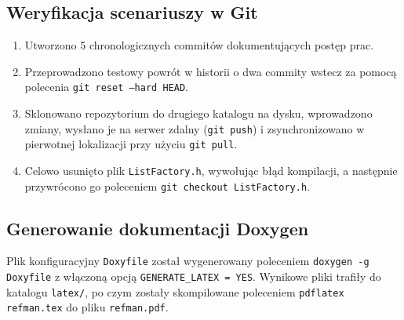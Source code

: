\subsection{Weryfikacja scenariuszy w Git}
\begin{enumerate}
    \item Utworzono 5 chronologicznych commitów dokumentujących postęp prac.
    \item Przeprowadzono testowy powrót w historii o dwa commity wstecz za pomocą polecenia \texttt{git reset --hard HEAD}.
    \item Sklonowano repozytorium do drugiego katalogu na dysku, wprowadzono zmiany, wysłano je na serwer zdalny (\texttt{git push}) i zsynchronizowano w pierwotnej lokalizacji przy użyciu \texttt{git pull}.
    \item Celowo usunięto plik \texttt{ListFactory.h}, wywołując błąd kompilacji, a następnie przywrócono go poleceniem \texttt{git checkout ListFactory.h}.
\end{enumerate}

\subsection{Generowanie dokumentacji Doxygen}
Plik konfiguracyjny \texttt{Doxyfile} został wygenerowany poleceniem \texttt{doxygen -g Doxyfile} z włączoną opcją \texttt{GENERATE\_LATEX = YES}. Wynikowe pliki trafiły do katalogu \texttt{latex/}, po czym zostały skompilowane poleceniem \texttt{pdflatex refman.tex} do pliku \texttt{refman.pdf}.
